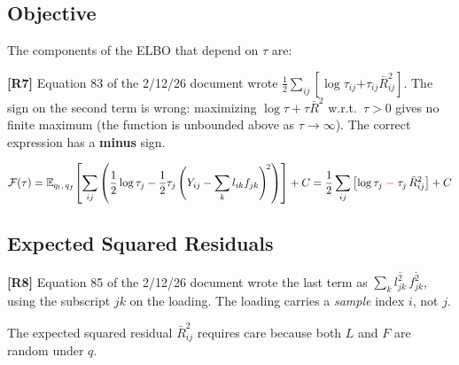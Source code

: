 \documentclass[11pt]{article}
\begin{document}
\subsection{Objective}

The components of the ELBO that depend on $\tau$ are:

\begin{correctionbox}
\textbf{[R7]} Equation 83 of the 2/12/26 document wrote
$\tfrac{1}{2}\sum_{ij}[\log\tau_{ij} \mathbf{+} \tau_{ij}\bar{R}^2_{ij}]$.
The sign on the second term is wrong: maximizing
$\log\tau + \tau\bar{R}^2$ w.r.t.\ $\tau > 0$ gives no finite maximum
(the function is unbounded above as $\tau\to\infty$).
The correct expression has a \textbf{minus} sign.
\end{correctionbox}

\begin{equation}\label{eq:tau-obj}
  \mathcal{F}(\tau)
  = \mathbb{E}_{q_l,\, q_f}\!\left[
    \sum_{ij}\left(\frac{1}{2}\log\tau_j
    - \frac{1}{2}\tau_j\left(Y_{ij} - \sum_k l_{ik}f_{jk}\right)^{\!2}
    \right)\right] + C
  = \frac{1}{2}\sum_{ij}
    \left[\log\tau_j \;{\color{red}-}\; \tau_j\,\bar{R}^2_{ij}\right] + C
\end{equation}

\subsection{Expected Squared Residuals}

\begin{correctionbox}
\textbf{[R8]} Equation 85 of the 2/12/26 document wrote the last term as
$\sum_k \overline{l^2_{jk}}\,\overline{f^2_{jk}}$, using the subscript $jk$ on
the loading.  The loading carries a \emph{sample} index $i$, not $j$.
\end{correctionbox}

The expected squared residual $\bar{R}^2_{ij}$ requires care because both $L$
and $F$ are random under $q$.
\end{document}
